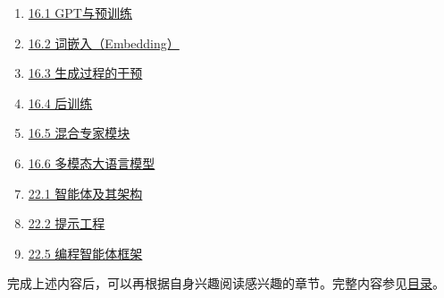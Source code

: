 \begin{enumerate}
  \href{docs/03-large-language-model/15-注意力机制与Transformer/15-04-位置编码.md}{15.4 位置编码}
\item
  \href{docs/03-large-language-model/16-大语言模型的基本原理/16-01-GPT与预训练.md}{16.1 GPT与预训练}
\item
  \href{docs/03-large-language-model/16-大语言模型的基本原理/16-02-词嵌入-Embedding.md}{16.2 词嵌入（Embedding）}
\item
  \href{docs/03-large-language-model/16-大语言模型的基本原理/16-03-生成过程的干预.md}{16.3 生成过程的干预}
\item
  \href{docs/03-large-language-model/16-大语言模型的基本原理/16-04-后训练.md}{16.4 后训练}
\item
  \href{docs/03-large-language-model/16-大语言模型的基本原理/16-05-混合专家模块.md}{16.5 混合专家模块}
\item
  \href{docs/03-large-language-model/16-大语言模型的基本原理/16-06-多模态大语言模型.md}{16.6 多模态大语言模型}
\item
  \href{docs/04-llm-agents/22-智能体/22-01-智能体及其架构.md}{22.1 智能体及其架构}
\item
  \href{docs/04-llm-agents/22-智能体/22-02-提示工程.md}{22.2 提示工程}
\item
  \href{docs/04-llm-agents/22-智能体/22-05-编程智能体框架.md}{22.5 编程智能体框架}
\end{enumerate}

完成上述内容后，可以再根据自身兴趣阅读感兴趣的章节。完整内容参见\href{目录.md}{目录}。

\clearpage
